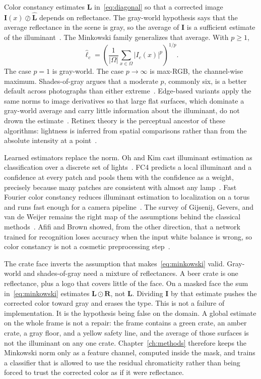 Color constancy estimates $\mathbf{L}$ in~\eqref{eq:diagonal} so that a corrected image $\mathbf{I}(x)\oslash\hat{\mathbf{L}}$ depends on reflectance. The gray-world hypothesis says that the average reflectance in the scene is gray, so the average of $\mathbf{I}$ is a sufficient estimate of the illuminant~\cite{buchsbaum1980grayworld}. The Minkowski family generalizes that average. With $p\ge 1$,
\begin{equation}
\hat{\ell}_c
= \left(
\frac{1}{\lvert\Omega\rvert}
\sum_{x\in\Omega} \lvert I_c(x)\rvert^{p}
\right)^{1/p}.
\label{eq:minkowski}
\end{equation}
The case $p=1$ is gray-world. The case $p\to\infty$ is max-RGB, the channel-wise maximum. Shades-of-gray argues that a moderate $p$, commonly six, is a better default across photographs than either extreme~\cite{finlayson2004shades}. Edge-based variants apply the same norms to image derivatives so that large flat surfaces, which dominate a gray-world average and carry little information about the illuminant, do not drown the estimate~\cite{vandeweijer2007edge}. Retinex theory is the perceptual ancestor of these algorithms: lightness is inferred from spatial comparisons rather than from the absolute intensity at a point~\cite{land1971retinex}.

Learned estimators replace the norm. Oh and Kim cast illuminant estimation as classification over a discrete set of lights~\cite{oh2017colorclass}. FC4 predicts a local illuminant and a confidence at every patch and pools them with the confidence as a weight, precisely because many patches are consistent with almost any lamp~\cite{hu2017fc4}. Fast Fourier color constancy reduces illuminant estimation to localization on a torus and runs fast enough for a camera pipeline~\cite{barron2017ffcc}. The survey of Gijsenij, Gevers, and van de Weijer remains the right map of the assumptions behind the classical methods~\cite{gijsenij2011survey}. Afifi and Brown showed, from the other direction, that a network trained for recognition loses accuracy when the input white balance is wrong, so color constancy is not a cosmetic preprocessing step~\cite{afifi2019colorbias}.

The crate face inverts the assumption that makes~\eqref{eq:minkowski} valid. Gray-world and shades-of-gray need a mixture of reflectances. A beer crate is one reflectance, plus a logo that covers little of the face. On a masked face the sum in~\eqref{eq:minkowski} estimates $\mathbf{L}\odot\mathbf{R}$, not $\mathbf{L}$. Dividing $\mathbf{I}$ by that estimate pushes the corrected color toward gray and erases the type. This is not a failure of implementation. It is the hypothesis being false on the domain. A global estimate on the whole frame is not a repair: the frame contains a green crate, an amber crate, a gray floor, and a yellow safety line, and the average of those surfaces is not the illuminant on any one crate. Chapter~\ref{ch:methods} therefore keeps the Minkowski norm only as a feature channel, computed inside the mask, and trains a classifier that is allowed to use the residual chromaticity rather than being forced to trust the corrected color as if it were reflectance.

